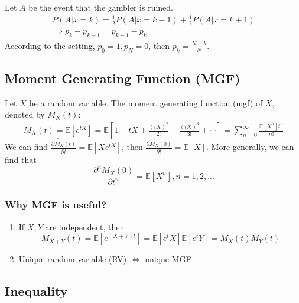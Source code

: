 \documentclass[11pt,a4paper]{article}
\begin{document}
Let $A$ be the event that the gambler is ruined.
\begin{equation}
    \begin{aligned}
        P(A|x=k)=\frac{1}{2}P(A|x=k-1)+\frac{1}{2}P(A|x=k+1)\\
        \Rightarrow p_k-p_{k-1}=p_{k+1}-p_k
    \end{aligned}
    \nonumber
\end{equation}
According to the setting, $p_0=1,p_N=0$, then $p_k=\frac{N-k}{N}$.

\subsection{Moment Generating Function (MGF)}
Let $X$ be a random variable. The moment generating function (mgf) of $X$, denoted by $M_X(t)$:
\begin{equation}
    \begin{aligned}
        \underline{M_X(t)=\mathbb{E}[e^{tX}]}=\mathbb{E}\left[1+tX+\frac{(tX)^2}{2!}+\frac{(tX)^3}{3!}+\cdots\right]=\sum_{n=0}^\infty\frac{\mathbb{E}[X^n]t^n}{n!}
    \end{aligned}
    \nonumber
\end{equation}
We can find $\frac{\partial M_X(t)}{\partial t}= \mathbb{E}\left[Xe^{tX}\right]$, then $\frac{\partial M_X(0)}{\partial t}= \mathbb{E}\left[X\right]$. More generally, we can find that $$\frac{\partial^n M_X(0)}{\partial t^n}= \mathbb{E}\left[X^n\right],n=1,2,...$$
\subsubsection*{Why MGF is useful?}
\begin{enumerate}[(1)]
    \item If $X,Y$ are independent, then $$M_{X+Y}(t)=\mathbb{E}[e^{(X+Y)t}]=\mathbb{E}[e^tX]\mathbb{E}[e^tY]=M_X(t)M_Y(t)$$
    \item Unique random variable (RV) $\Leftrightarrow$ unique MGF
\end{enumerate}

\subsection{Inequality}
\end{document}
